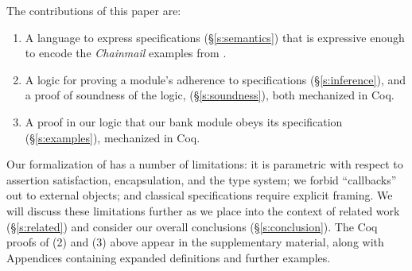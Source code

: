 %
The contributions of this paper are:\begin{enumerate}
 \item
A language to
express \Nec specifications (\S\ref{s:semantics}) that is  expressive
enough to encode the \emph{Chainmail} examples from . 
 \item
A logic for proving a module's adherence to 
 \Nec specifications (\S\ref{s:inference}), and a proof of soundness of the logic, (\S\ref{s:soundness}),
both mechanized in Coq. 
 \item
A proof in our logic %
  that our bank module obeys its \Nec specification (\S\ref{s:examples}), mechanized in Coq.
\end{enumerate}



Our formalization of \Nec has a number of limitations: 
it is 
parametric with respect to assertion
satisfaction, encapsulation, and the type system;
 we forbid 
``callbacks'' out to external objects; and
classical specifications require explicit framing.
We will discuss these limitations further as we place \Nec into the context of 
related work (\S\ref{s:related}) and consider our overall conclusions
(\S\ref{s:conclusion}). 
%
The Coq proofs of 
(2) and (3) above %
appear in the
supplementary material, along with Appendices containing expanded 
definitions and further examples.
 
